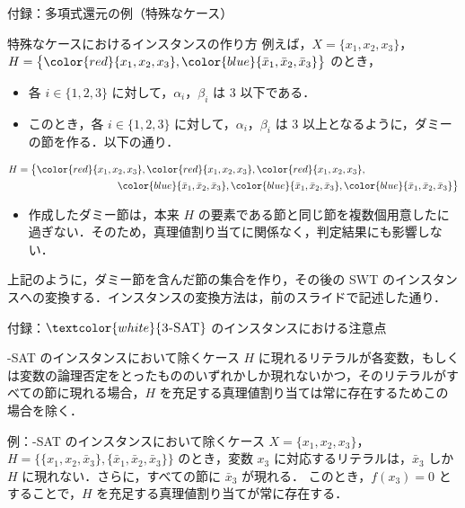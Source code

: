 \documentclass[dvipdfmx]{beamer}
\begin{document}
    \begin{frame}{付録：多項式還元の例（特殊なケース）}
      \begin{block}{特殊なケースにおけるインスタンスの作り方}
        例えば，$X = \{x_1,x_2,x_3\}$，$H = \big\{{\color{red}\{x_1,x_2,x_3\}},{\color{blue}\{\bar x_1, \bar x_2, \bar x_3\}}\big\}$ のとき，
        \begin{itemize}
          \item
          各 $i \in \{1,2,3\}$ に対して，$\alpha_i$，$\beta_i$ は 3 以下である．
          \item
          このとき，各 $i \in \{1,2,3\}$ に対して，$\alpha_i$，$\beta_i$ は 3 以上となるように，ダミーの節を作る．以下の通り．
        \end{itemize}
        \begin{equation}
          \begin{split}
            H &= \big\{
            {\color{red}\{x_1,x_2,x_3\}},
            {\color{red}\{x_1,x_2,x_3\}},
            {\color{red}\{x_1,x_2,x_3\}},
            \\ & \qquad\qquad\qquad\qquad\qquad
            {\color{blue}\{\bar x_1, \bar x_2, \bar x_3\}},
            {\color{blue}\{\bar x_1, \bar x_2, \bar x_3\}},
            {\color{blue}\{\bar x_1, \bar x_2, \bar x_3\}}
            \big\} \notag
          \end{split}
        \end{equation}
        \begin{itemize}
          \item 作成したダミー節は，本来 $H$ の要素である節と同じ節を複数個用意したに過ぎない．そのため，真理値割り当てに関係なく，判定結果にも影響しない．
        \end{itemize}
        上記のように，ダミー節を含んだ節の集合を作り，その後の SWT のインスタンスへの変換する．インスタンスの変換方法は，前のスライドで記述した通り．
      \end{block}
    \end{frame}

    \begin{frame}{付録：${\textcolor{white}{\mbox {\sc 3-SAT}}}$ のインスタンスにおける注意点}
      \begin{block}{{-SAT} のインスタンスにおいて除くケース}
        $H$ に現れるリテラルが各変数，もしくは変数の論理否定をとったもののいずれかしか現れないかつ，そのリテラルがすべての節に現れる場合，$H$ を充足する真理値割り当ては常に存在するためこの場合を除く．
      \end{block}

      \begin{exampleblock}{例：{-SAT} のインスタンスにおいて除くケース}
        $X = \{x_1,x_2,x_3\}$，
        $H = \big\{\{x_1,x_2,\bar x_3\}, \{\bar x_1, \bar x_2, \bar x_3\}\big\}$ のとき，変数 $x_3$ に対応するリテラルは，$\bar x_3$ しか $H$ に現れない．さらに，すべての節に $\bar x_3$ が現れる．
        このとき，$f(x_3) = 0$ とすることで，$H$ を充足する真理値割り当てが常に存在する．
      \end{exampleblock}
    \end{frame}
\end{document}
